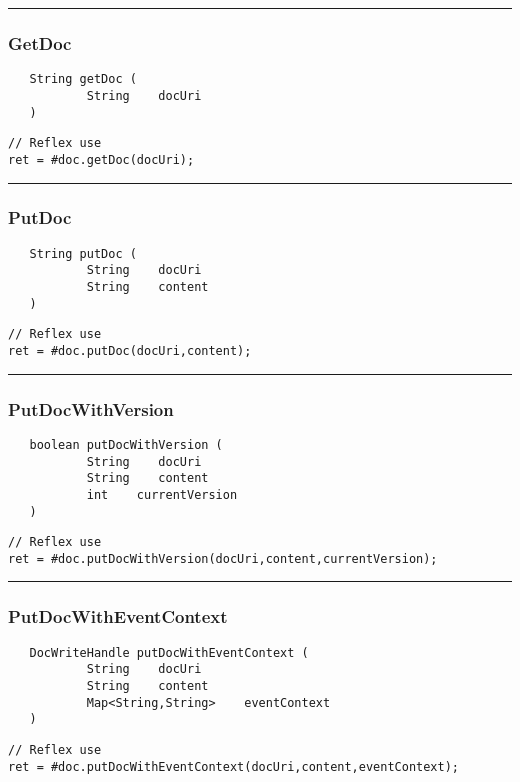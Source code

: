 \rule{15cm}{2pt}
\subsubsection{GetDoc}
\label{Api:GetDoc}
\begin{verbatim}
   String getDoc (
           String    docUri
   )
\end{verbatim}
\begin{lstlisting}[language=reflex]
// Reflex use
ret = #doc.getDoc(docUri);
\end{lstlisting}



\rule{15cm}{2pt}
\subsubsection{PutDoc}
\label{Api:PutDoc}
\begin{verbatim}
   String putDoc (
           String    docUri
           String    content
   )
\end{verbatim}
\begin{lstlisting}[language=reflex]
// Reflex use
ret = #doc.putDoc(docUri,content);
\end{lstlisting}



\rule{15cm}{2pt}
\subsubsection{PutDocWithVersion}
\label{Api:PutDocWithVersion}
\begin{verbatim}
   boolean putDocWithVersion (
           String    docUri
           String    content
           int    currentVersion
   )
\end{verbatim}
\begin{lstlisting}[language=reflex]
// Reflex use
ret = #doc.putDocWithVersion(docUri,content,currentVersion);
\end{lstlisting}



\rule{15cm}{2pt}
\subsubsection{PutDocWithEventContext}
\label{Api:PutDocWithEventContext}
\begin{verbatim}
   DocWriteHandle putDocWithEventContext (
           String    docUri
           String    content
           Map<String,String>    eventContext
   )
\end{verbatim}
\begin{lstlisting}[language=reflex]
// Reflex use
ret = #doc.putDocWithEventContext(docUri,content,eventContext);
\end{lstlisting}



